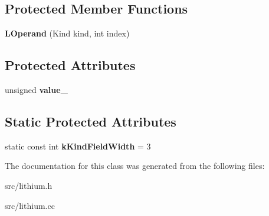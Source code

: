 \subsection*{Protected Member Functions}
\begin{DoxyCompactItemize}
\item 
\hypertarget{classv8_1_1internal_1_1_l_operand_ad9c5e7b9c36e7ad63f604d687b69cad5}{}{\bfseries L\+Operand} (Kind kind, int index)\label{classv8_1_1internal_1_1_l_operand_ad9c5e7b9c36e7ad63f604d687b69cad5}

\end{DoxyCompactItemize}
\subsection*{Protected Attributes}
\begin{DoxyCompactItemize}
\item 
\hypertarget{classv8_1_1internal_1_1_l_operand_ad2c4256a03a146024e96329df5e291ef}{}unsigned {\bfseries value\+\_\+}\label{classv8_1_1internal_1_1_l_operand_ad2c4256a03a146024e96329df5e291ef}

\end{DoxyCompactItemize}
\subsection*{Static Protected Attributes}
\begin{DoxyCompactItemize}
\item 
\hypertarget{classv8_1_1internal_1_1_l_operand_a43ed2f7086442769abca2d654c816f48}{}static const int {\bfseries k\+Kind\+Field\+Width} = 3\label{classv8_1_1internal_1_1_l_operand_a43ed2f7086442769abca2d654c816f48}

\end{DoxyCompactItemize}


The documentation for this class was generated from the following files\+:\begin{DoxyCompactItemize}
\item 
src/lithium.\+h\item 
src/lithium.\+cc\end{DoxyCompactItemize}
